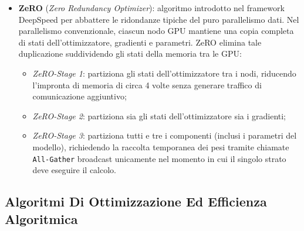 \documentclass[11pt, a4paper]{article}
\begin{document}
\begin{itemize}
    \item \textbf{ZeRO} (\emph{Zero Redundancy Optimizer}): algoritmo introdotto nel framework DeepSpeed per abbattere le ridondanze tipiche del puro parallelismo dati. Nel parallelismo convenzionale, ciascun nodo GPU mantiene una copia completa di stati dell'ottimizzatore, gradienti e parametri. ZeRO elimina tale duplicazione suddividendo gli stati della memoria tra le GPU:
    \begin{itemize}
        \item \emph{ZeRO-Stage 1}: partiziona gli stati dell'ottimizzatore tra i nodi, riducendo l'impronta di memoria di circa 4 volte senza generare traffico di comunicazione aggiuntivo;
        \item \emph{ZeRO-Stage 2}: partiziona sia gli stati dell'ottimizzatore sia i gradienti;
        \item \emph{ZeRO-Stage 3}: partiziona tutti e tre i componenti (inclusi i parametri del modello), richiedendo la raccolta temporanea dei pesi tramite chiamate \texttt{All-Gather} broadcast unicamente nel momento in cui il singolo strato deve eseguire il calcolo.
    \end{itemize}
\end{itemize}


\subsection{Algoritmi Di Ottimizzazione Ed Efficienza Algoritmica}
\end{document}
